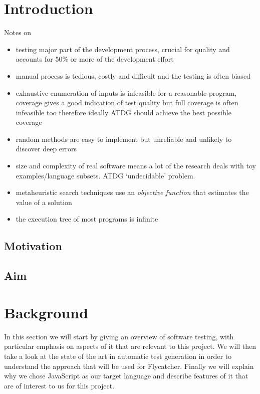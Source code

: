 \documentclass[a4paper,11pt,titlepage]{report}
\begin{document}
\chapter{Introduction}
Notes on \cite{mcminn2004search}
\begin{itemize}
\item testing major part of the development process, crucial for quality and accounts for 50\% or more of the development effort
\item manual process is tedious, costly and difficult and the testing is often biased
\item exhaustive enumeration of inputs is infeasible for a reasonable program, coverage gives a good indication of test quality but full coverage is often infeasible too therefore ideally ATDG should achieve the best possible coverage
\item random methods are easy to implement but unreliable and unlikely to discover deep errors
\item size and complexity of real software means a lot of the research deals with toy examples/language subsets. ATDG `undecidable' problem.
\item metaheuristic search techniques use an \emph{objective function} that estimates the value of a solution
\item the execution tree of most programs is infinite \cite{king1976symbolic}

\end{itemize}

\section{Motivation}
\section{Aim}

\chapter{Background}
In this section we will start by giving an overview of software testing, with particular emphasis on aspects of it that are relevant to this project. We will then take a look at the state of the art in automatic test generation in order to understand the approach that will be used for Flycatcher. Finally we will explain why we chose JavaScript as our target language and describe features of it that are of interest to us for this project.
\end{document}
